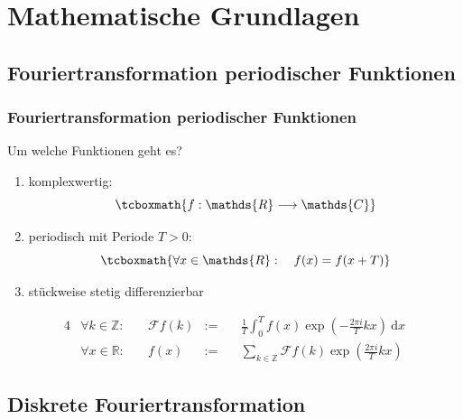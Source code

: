 \documentclass[aspectratio=169]{beamer}
\newcommand{\curvb}[1]{\left( #1 \right)}
\newcommand{\diff}{\mathrm{d}}
\newcommand{\integral}[4]{\int_{#1}^{#2} #3\ \diff #4}
\newcommand{\SR}{\mathds{R}} %
\newcommand{\SC}{\mathds{C}} %
\newcommand{\SZ}{\mathds{Z}} %
\newcommand{\FF}{\mathcal{F}} %
\begin{document}

	\section{Mathematische Grundlagen} %
	\label{sec:mathematische_grundlagen}
	
		\subsection{Fouriertransformation periodischer Funktionen} %
		\label{sub:fouriertransformation}

			\begin{frame}
				\frametitle{Fouriertransformation periodischer Funktionen}
				Um welche Funktionen geht es?\\

				\begin{enumerate}[label=(\roman*)]
					\pause\item komplexwertig: 
						\[ \tcboxmath{f:\SR\longrightarrow\SC} \]
					\pause\item periodisch mit Periode $T>0$:
						\[ \tcboxmath{\forall x\in\SR:\quad f(x) = f(x+T)} \]
					\pause\item stückweise stetig differenzierbar
				\end{enumerate}
			\end{frame}

			\begin{frame}
				\begin{tcolorbox}[title=Fouriertransformation]
					\begin{alignat*}{4}
						&\forall k\in\SZ:\quad &\FF f(k) &:= &&\ \frac{1}{T}\integral{0}{T}{ f(x)\exp\curvb{ -\frac{2\pi i}{T}kx } }{x} \\
						&\forall x\in\SR:\quad &f(x) &:= &&\ \sum_{k\in\SZ}\FF f(k)\exp\curvb{ \frac{2\pi i}{T}kx }
					\end{alignat*}
				\end{tcolorbox}
			\end{frame}


		\subsection{Diskrete Fouriertransformation} %
		\label{sub:diskrete_fouriertransformation}
\end{document}
